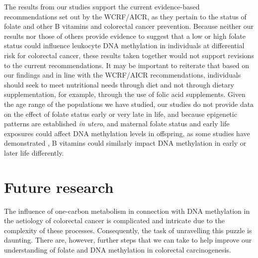 \noindent The results from our studies support the current evidence-based recommendations set out by the WCRF/AICR, as they pertain to the status of folate and other B vitamins and colorectal cancer prevention. Because neither our results nor those of others provide evidence to suggest that a low or high folate status could influence leukocyte DNA methylation in individuals at differential risk for colorectal cancer, these results taken together would not support revisions to the current recommendations. It may be important to reiterate that based on our findings and in line with the WCRF/AICR recommendations, individuals should seek to meet nutritional needs through diet and not through dietary supplementation, for example, through the use of folic acid supplements. Given the age range of the populations we have studied, our studies do not provide data on the effect of folate status early or very late in life, and because epigenetic patterns are established \emph{in utero}, and maternal folate status and early life exposures could affect DNA methylation levels in offspring, as some studies have demonstrated \cite{c788,c789}, B vitamins could similarly impact DNA methylation in early or later life differently. 
 
\section{Future research} %
\noindent The influence of one-carbon metabolism in connection with DNA methylation in the aetiology of colorectal cancer is complicated and intricate due to the complexity of these processes. Consequently, the task of unravelling this puzzle is daunting. There are, however, further steps that we can take to help improve our understanding of folate and DNA methylation in colorectal carcinogenesis.
 
